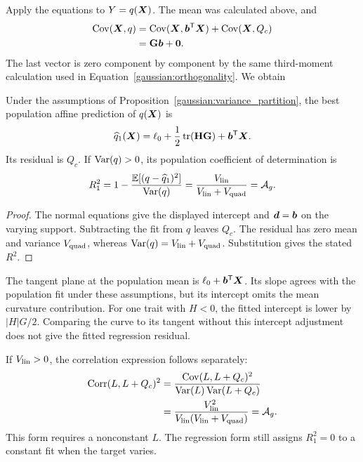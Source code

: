 Apply the equations to $Y=q(\boldsymbol{X})$. The mean was calculated above, and
\begin{align}
\operatorname{Cov}(\boldsymbol{X},q)
 &=\operatorname{Cov}(\boldsymbol{X},\boldsymbol{b}^{\mathsf T}\boldsymbol{X})
   +\operatorname{Cov}(\boldsymbol{X},Q_c)\nonumber\\
 &=\mathbf{G}\boldsymbol{b}+\boldsymbol{0}.
\end{align}
The last vector is zero component by component by the same third-moment
calculation used in Equation~\eqref{gaussian:orthogonality}. We obtain
\begin{proposition}
\label{gaussian:affine_projection}
Under the assumptions of Proposition~\ref{gaussian:variance_partition}, the
best population affine prediction of $q(\boldsymbol{X})$ is
\begin{equation}
\widehat q_1(\boldsymbol{X})
 =\ell_0+\frac12\operatorname{tr}(\mathbf{H}\mathbf{G})+\boldsymbol{b}^{\mathsf T}\boldsymbol{X}.
\label{gaussian:fitted_affine}
\end{equation}
Its residual is $Q_c$. If $\operatorname{Var}(q)>0$, its population coefficient of
determination is
\begin{equation}
R_1^2
 =1-\frac{\mathbb E[(q-\widehat q_1)^2]}{\operatorname{Var}(q)}
 =\frac{V_{\mathrm{lin}}}{V_{\mathrm{lin}}+V_{\mathrm{quad}}}
 =\mathcal A_g.
\label{gaussian:regression_share}
\end{equation}
\end{proposition}
\begin{proof}
The normal equations give the displayed intercept and $\boldsymbol{d}=\boldsymbol{b}$
on the varying support. Subtracting the fit from $q$ leaves $Q_c$.
The residual has zero mean and variance $V_{\mathrm{quad}}$, whereas
$\operatorname{Var}(q)=V_{\mathrm{lin}}+V_{\mathrm{quad}}$. Substitution gives the stated $R^2$.
\end{proof}

The tangent plane at the population mean is
$\ell_0+\boldsymbol{b}^{\mathsf T}\boldsymbol{X}$. Its slope agrees with the population
fit under these assumptions, but its intercept omits the mean curvature
contribution. For one trait with $H<0$, the fitted intercept is lower by
$|H|G/2$. Comparing the curve to its tangent without this intercept
adjustment does not give the fitted regression residual.

If $V_{\mathrm{lin}}>0$, the correlation expression follows separately:
\begin{align}
\operatorname{Corr}(L,L+Q_c)^2
 &=\frac{\operatorname{Cov}(L,L+Q_c)^2}
         {\operatorname{Var}(L)\operatorname{Var}(L+Q_c)}\nonumber\\
 &=\frac{V_{\mathrm{lin}}^2}{V_{\mathrm{lin}}(V_{\mathrm{lin}}+V_{\mathrm{quad}})}=\mathcal A_g.
\label{gaussian:correlation_identity}
\end{align}
This form requires a nonconstant $L$. The regression form still assigns
$R_1^2=0$ to a constant fit when the target varies.

